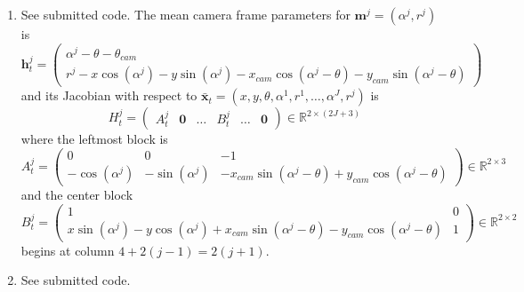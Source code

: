 \documentclass[12pt]{article}
\begin{document}
\begin{enumerate}
\begin{align*}
\begin{array}{cccccccc}
		0 & 0 & 1 & 0 & 0 & \ldots & 0 & 0 \\
		0 & 0 & 0 & 1 & 0 & \ldots & 0 & 0 \\
		0 & 0 & 0 & 0 & 1 & \ldots & 0 & 0 \\
		\vdots & \vdots & \vdots & \vdots & \vdots & \ddots & \vdots & \vdots \\
		0 & 0 & 0 & 0 & 0 & \ldots & 1 & 0 \\
		0 & 0 & 0 & 0 & 0 & \ldots & 0 & 1
		\end{array}\right) \\
		G_u = \frac{1}{\omega_t}&\left(\begin{array}{cc}
		\sin(\theta_t) - \sin(\theta_{t-1}) & -\frac{V_t}{\omega_t}(\sin(\theta_t) - \sin(\theta_{t-1})) + V_t\cos(\theta_t)dt \\
		-\cos(\theta_t) + \cos(\theta_{t-1}) & \frac{V_t}{\omega_t}(\cos(\theta_t) - \cos(\theta_{t-1})) + V_t\sin(\theta_t)dt \\
		0 & \omega_tdt \\
		0 & dt \\
		0 & 0 \\
		0 & 0 \\
		\vdots & \vdots \\
		0 & 0 \\
		0 & 0
		\end{array}\right).
	\end{align*}
	where $\theta_t := \theta_{t-1} + \omega_tdt$.
	\item See submitted code. The mean camera frame parameters for $\mathbf{m}^j = (\alpha^j, r^j)$ is
	\[
		\mathbf{h}_t^j = \left(\begin{array}{c}
		\alpha^j - \theta - \theta_{cam} \\
		r^j - x\cos(\alpha^j) - y\sin(\alpha^j) - x_{cam}\cos(\alpha^j - \theta) - y_{cam}\sin(\alpha^j - \theta)
		\end{array}\right)
	\]
	and its Jacobian with respect to $\bar{\mathbf{x}}_t = (x,y,\theta,\alpha^1,r^1,\ldots, \alpha^J,r^j)$ is
	\[
		H_t^j = \left(\begin{array}{cccccc}
		A_t^j & \mathbf{0} & \ldots & B_t^j & \ldots & \mathbf{0}
		\end{array}\right) \in \mathbb{R}^{2 \times (2J + 3)}
	\]
	where the leftmost block is
	\[
		A_t^j = \left(\begin{array}{ccc}
			0 & 0 & -1 \\
			-\cos(\alpha^j) & -\sin(\alpha^j) & -x_{cam}\sin(\alpha^j - \theta) + y_{cam}\cos(\alpha^j - \theta)
		\end{array}\right) \in \mathbb{R}^{2 \times 3}
	\]
	and the center block
	\[
		B_t^j = \left(\begin{array}{cc}
			1 & 0 \\
			x\sin(\alpha^j) - y\cos(\alpha^j) + x_{cam}\sin(\alpha^j - \theta) -y_{cam}\cos(\alpha^j - \theta) & 1
		\end{array}\right) \in \mathbb{R}^{2 \times 2}
	\]
	begins at column $4 + 2(j-1) = 2(j+1)$.
	\item See submitted code.
\end{enumerate}
\end{document}
